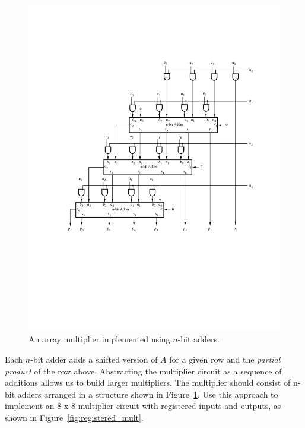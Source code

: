 \documentclass[epsfig,10pt,fullpage]{article}
\begin{document}
\begin{figure}[H]
\centerline{
\includegraphics{figures/array_mult_adders}}
\caption{An array multiplier implemented using $n$-bit adders.}
\label{fig:array_mult_adders}
\end{figure}

Each $n$-bit adder adds a shifted version of $A$ for a given row and the {\it partial
product} of the row above. Abstracting the multiplier circuit as a sequence of additions 
allows us to build larger multipliers. The multiplier should consist of n-bit adders
arranged in a structure shown in Figure~\ref{fig:array_mult_adders}. Use this approach to 
implement an 8 {\sf x} 8 multiplier circuit with registered
inputs and outputs, as shown in Figure~\ref{fig:registered_mult}.
\end{document}

